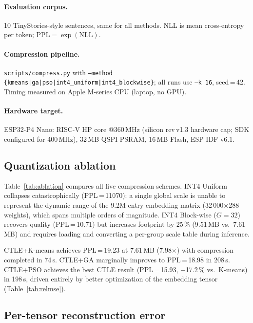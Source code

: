 \documentclass[lettersize,journal]{IEEEtran}
\begin{document}
\paragraph{Evaluation corpus.}
10 TinyStories-style sentences, same for all methods.
NLL is mean cross-entropy per token; $\mathrm{PPL}=\exp(\mathrm{NLL})$.

\paragraph{Compression pipeline.}
\texttt{scripts/compress.py} with \texttt{--method \{kmeans|ga|pso|int4\_uniform|int4\_blockwise\}};
all runs use \texttt{--k 16}, seed\,=\,42.
Timing measured on Apple M-series CPU (laptop, no GPU).

\paragraph{Hardware target.}
ESP32-P4 Nano: RISC-V HP core @360\,MHz (silicon rev\,v1.3 hardware cap;
SDK configured for 400\,MHz), 32\,MB QSPI PSRAM, 16\,MB Flash, ESP-IDF v6.1.

\subsection{Quantization ablation}
\label{sec:ablation}

Table~\ref{tab:ablation} compares all five compression schemes.
INT4 Uniform collapses catastrophically (PPL\,=\,11070): a single global scale
is unable to represent the dynamic range of the 9.2M-entry embedding matrix
(32\,000$\times$288 weights), which spans multiple orders of magnitude.
INT4 Block-wise ($G\!=\!32$) recovers quality (PPL\,=\,10.71) but increases
footprint by 25\,\% (9.51\,MB vs.\ 7.61\,MB) and requires loading and
converting a per-group scale table during inference.

CTLE+K-means achieves PPL\,=\,19.23 at 7.61\,MB (7.98$\times$) with
compression completed in 74\,s.
CTLE+GA marginally improves to PPL\,=\,18.98 in 208\,s.
CTLE+PSO achieves the best CTLE result (PPL\,=\,15.93, $-$17.2\,\% vs.\
K-means) in 198\,s, driven entirely by better optimization of the embedding
tensor (Table~\ref{tab:relmse}).



\subsection{Per-tensor reconstruction error}
\label{sec:relmse}
\end{document}
